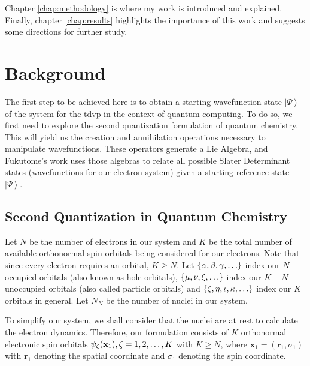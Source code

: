 \documentclass{aux/ttuthes2007}
\newcommand{\bx}{\bm{x}}
\newcommand{\br}{\bm{r}}
\newcommand{\ket}[1]{\ensuremath{\left|#1\right\rangle}}
\newcommand{\paren}[1]{\left( #1 \right)}
\newcommand{\elec}{N}
\newcommand{\nuc}{N_{N}}
\newcommand{\orb}{K}
\newcommand{\uo}[1]{
		\IfEqCase{#1}{
			{0}{\mu}
			{1}{\nu}
			{2}{\xi}
		}[\PackageError{uo}{Undefined option to uo: #1}{}]
}
\newcommand{\oo}[1]{
		\IfEqCase{#1}{
			{0}{\alpha}
			{1}{\beta}
			{2}{\gamma}
		}[\PackageError{unocorb}{Undefined option to unuo: #1}{}]
}
\newcommand{\go}[1]{
		\IfEqCase{#1}{
			{0}{\zeta}
			{1}{\eta}
			{2}{\iota}
			{3}{\kappa}
		}[\PackageError{unocorb}{Undefined option to go: #1}{}]
}
\newcommand{\psig}[1]{
	\psi_{\go{#1}}
}
\begin{document}
Chapter \ref{chap:methodology} is where my work is introduced and explained. Finally, chapter \ref{chap:results} highlights the importance of this work and suggests some directions for further study.

\chapter{\textbf{Background}}\label{chap:background}

The first step to be achieved here is to obtain a starting wavefunction state $\ket\Psi$ of the system for the \gls{tdvp} in the context of quantum computing. 
To do so, we first need to explore the second quantization formulation of quantum chemistry. 
This will yield us the creation and annihilation operations necessary to manipulate wavefunctions.
These operators generate a Lie Algebra, and Fukutome's work  uses those algebras to relate all possible Slater Determinant states (wavefunctions for our electron system) given a starting reference state $\ket\Psi$.

\section {\textbf{Second Quantization in Quantum Chemistry}}

Let $\elec$ be the number of electrons in our system and $\orb$ be the total number of available orthonormal spin orbitals being considered for our electrons.
Note that since every electron requires an orbital, $\orb \geq \elec$.
Let 
$\{\oo{0}, \oo{1}, \oo{2}, \ldots\}$
index our $\elec$ occupied orbitals (also known as hole orbitals), 
$\{\uo{0},\uo{1},\uo{2}, \ldots\}$ 
index  our $\orb - \elec$ unoccupied orbitals (also called particle orbitals) and 
$\{\go{0}, \go{1}, \go{2}, \go{3}, \ldots\}$
index our $\orb$ orbitals in general.
Let $\nuc$ be the number of nuclei in our system.

To simplify our system, we shall consider that the nuclei are at rest to calculate the electron dynamics. Therefore, our formulation consists of $\orb$ orthonormal electronic spin orbitals $\psig 0(\mathbf{x}_1), \go{0} = 1, 2, \ldots, \orb$ with $\orb \geq \elec$, where $\bx_1 = \paren{\br_1, \sigma_1}$ with $\br_1$ denoting the spatial coordinate and $\sigma_1$ denoting the spin coordinate.
\end{document}
